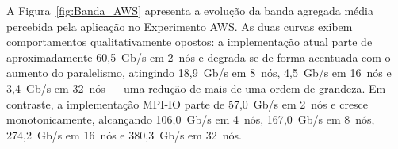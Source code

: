 \begin{table}[H]
\centering
\caption{Resumo comparativo entre a implementação atual e MPI-IO no
Experimento AWS. Este trabalho calcula a melhoria no total e a melhoria de
I/O em relação à implementação atual; valores negativos indicam piora.}
\label{tab:comparativo_aws}
\small
\setlength{\tabcolsep}{3pt}
\renewcommand{\arraystretch}{1.25}
\end{table}

A Figura~\ref{fig:Banda_AWS} apresenta a evolução da banda agregada
média percebida pela aplicação no Experimento AWS. As duas curvas exibem comportamentos
qualitativamente opostos: a
implementação atual parte de aproximadamente 60{,}5~Gb/s em 2~nós
e degrada-se de forma acentuada com o aumento do paralelismo, atingindo
18{,}9~Gb/s em 8~nós, 4{,}5~Gb/s em 16~nós e 3{,}4~Gb/s em 32~nós ---
uma redução de mais de uma ordem de grandeza. Em contraste, a
implementação MPI-IO parte de 57{,}0~Gb/s em 2~nós e cresce
monotonicamente, alcançando 106{,}0~Gb/s em 4~nós, 167{,}0~Gb/s em
8~nós, 274{,}2~Gb/s em 16~nós e 380{,}3~Gb/s em 32~nós.

